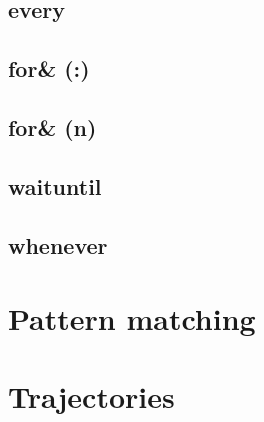 \subsection{every}
\subsection{for\& (:)}
\subsection{for\& (n)}
\subsection{waituntil}
\subsection{whenever}

\FloatBarrier
\section{Pattern matching}
\FloatBarrier
\section{Trajectories}

